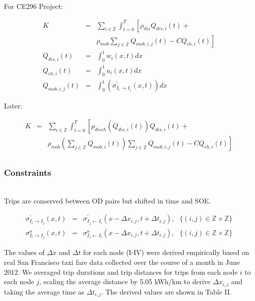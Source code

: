\documentclass[journal]{IEEEtran}
\begin{document}
For CE296 Project:

\begin{eqnarray*}
    K &=& \sum_{i\in\mathbb{Z}} \int_{t=0}^{T} \left[ \rho_{dis} Q_{dis,i}(t) + \right. \\ 
    && \left. \rho_{mob}\sum_{j\in\mathbb{Z}}Q_{mob,i,j}(t)  - CQ_{ch,i}(t) \right]\\
    Q_{dis,i}(t) & = & \int_{0}^{1} w_i(x,t) dx \\
    Q_{ch,i}(t) & = & \int_{0}^{1} u_i(x,t) dx \\
    Q_{mob,i,j}(t) & = & \int_{0}^{1}\left( \sigma_{I_i \rightarrow I_j}^\prime(x,t) \right)dx
\end{eqnarray*}

Later:

\begin{eqnarray*}
    K &=& \sum_{i\in\mathbb{Z}} \int_{t=0}^{T} \left[ \rho_{disch}(Q_{dis,i}(t)) Q_{dis,i}(t) + \right. \\ && \left. \rho_{mob}\left(\sum_{j\in\mathbb{Z}}Q_{mob,i}(t)\right)\sum_{j\in\mathbb{Z}}Q_{mob,i,j}(t) - CQ_{ch,i}(t) \right]\\
\end{eqnarray*}

\subsubsection{Constraints}
~ \\

Trips are conserved between OD pairs but shifted in time and SOE.

\begin{eqnarray*}
    \sigma_{I_i \rightarrow I_j}^\prime(x,t) & = & \sigma_{I_j \leftarrow I_i}^\prime(x - \Delta x_{i,j},t + \Delta t_{i,j}), ~~~ \{(i,j) \in \mathbb{Z} \times \mathbb{Z}\} \\
     \sigma_{I_i \rightarrow I_j}^o(x,t) & = & \sigma_{I_j \leftarrow I_i}^o(x - \Delta x_{i,j},t + \Delta t_{i,j}), ~~~ \{(i,j) \in \mathbb{Z} \times \mathbb{Z}\}
\end{eqnarray*}

The values of $\Delta x$ and $\Delta t$ for each node (I-IV) were derived empirically based on real San Francisco taxi fare data collected over the course of a month in June 2012. We averaged trip durations and trip distances for trips from each node $i$ to each node $j$,  scaling the average distance by 5.05 kWh/km to derive $\Delta x_{i,j}$ and taking the average time as $\Delta t_{i,j}$. The derived values are shown in Table II.
\end{document}
